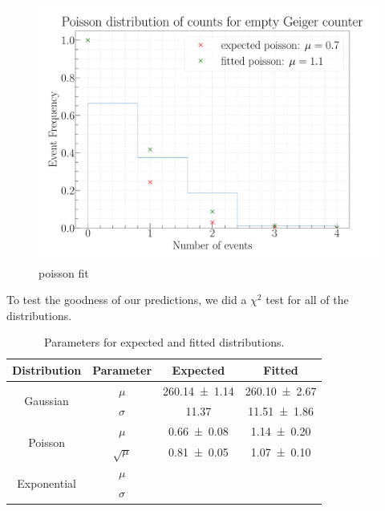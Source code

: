 \begin{figure}[H]
\centering
\includegraphics[width=\textwidth]{../Figures/Geiger_poisson_fit.pdf}
\caption{poisson fit}
\label{fig:PoissonFit}
\end{figure}

To test the goodness of our predictions, we did a $\chi^2$ test for all of the distributions.   

\begin{table}[H]
	\renewcommand{\arraystretch}{1.5}
	\centering
	\begin{tabular}{|c|c|c|c|}
		\hline
		Distribution & Parameter & Expected & Fitted \\
		\hline
		\multirow{2}{*}{Gaussian} & $\mu$ & \SI{260.14 \pm 1.14}{} & \SI{260.10 \pm 2.67}{} \\
		 & $\sigma$ & \SI{11.37}{} & \SI{11.51 \pm 1.86}{} \\
		\hline
		\multirow{2}{*}{Poisson} & $\mu$ & \SI{0.66 \pm 0.08}{} & \SI{1.14 \pm 0.20}{} \\
		 & $\sqrt{\mu}$ & \SI{0.81 \pm 0,05}{} & \SI{1,07 \pm 0,10}{} \\
		\hline
		\multirow{2}{*}{Exponential} & $\mu$ & \SI{}{} & \SI{}{} \\
		 & $\sigma$ & \SI{}{} & \SI{}{} \\
		\hline
	\end{tabular}
	\caption{Parameters for expected and fitted distributions.}
	\label{tab:DistPara}
\end{table}

